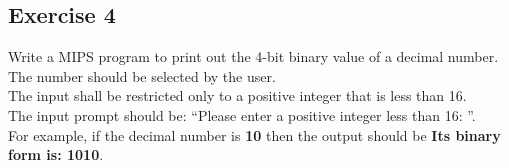 \subsection{Exercise 4}
Write a MIPS program to print out the 4-bit binary value of a decimal
number. The number should be selected by the user.\\
The input shall be restricted only to a positive integer that is less than 16.\\
The input prompt should be: ``Please enter a positive integer less than 16: ''.\\
For example, if the decimal number is \textbf{10} then the output should be \textbf{Its
binary form is: 1010}.

